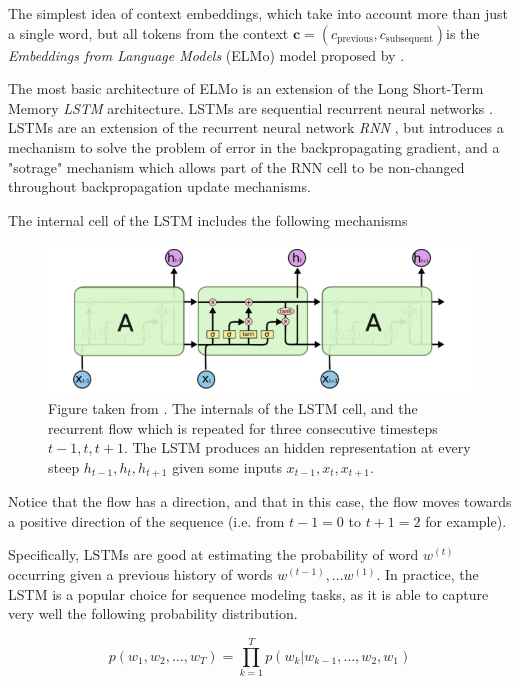 \documentclass[a4paper,12pt,twoside,openright]{report}
\begin{document}
The simplest idea of context embeddings, which take into account more than just a single word, but all tokens from the context $\mathbf{c} = (c_\text{previous}, c_\text{subsequent}) $is the \textit{Embeddings from Language Models} (ELMo) model proposed by \cite{peters17b}.

The most basic architecture of ELMo is an extension of the Long Short-Term Memory \textit{LSTM} architecture.
LSTMs are sequential recurrent neural networks \cite{hochreiter97}.
LSTMs are an extension of the recurrent neural network \textit{RNN} \cite{rumelhart85}, but introduces a mechanism to solve the problem of error in the backpropagating gradient, and a "sotrage" mechanism which allows part of the RNN cell to be non-changed throughout backpropagation update mechanisms.

The internal cell of the LSTM includes the following mechanisms

\begin{figure}[h]
	\center
  \includegraphics[width=\linewidth]{./assets/background/LSTM.png}
  \caption{Figure taken from \cite{colahLSTM}. The internals of the LSTM cell, and the recurrent flow which is repeated for three consecutive timesteps $t-1, t, t+1$. 
  The LSTM produces an hidden representation at every steep $h_{t-1}, h_{t}, h_{t+1}$ given some inputs $x_{t-1}, x_t, x_{t+1}$.
  }
  \label{fig:lstm_internals}
\end{figure}

Notice that the flow has a direction, and that in this case, the flow moves towards a positive direction of the sequence (i.e. from $t-1 = 0$ to $t + 1 = 2$ for example).

Specifically, LSTMs \cite{hochreiter97} are good at estimating the probability of word $w^{(t)}$ occurring given a previous history of words $w^{(t-1)}, \ldots w^{(1)}$.
In practice, the LSTM is a popular choice for sequence modeling tasks, as it is able to capture very well the following probability distribution.

\begin{equation}
p\left(w_{1},  w_{2}, \ldots, w_{T} \right)=\prod_{k=1}^{T} p\left(w_{k} | w_{k-1}, \ldots, w_{2}, w_{1}\right)
\end{equation}
\end{document}

